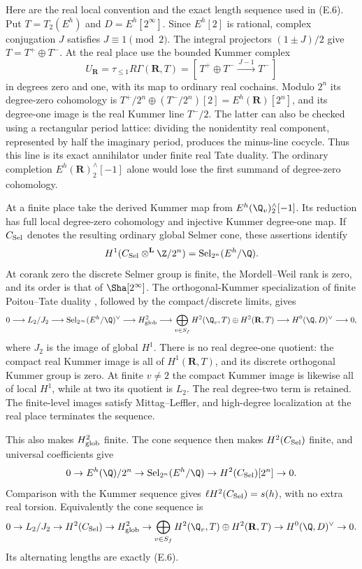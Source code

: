 Here are the real local convention and the exact length sequence used
in (E.6). Put $T=T_2(E^h)$ and $D=E^h[2^\infty]$. Since $E^h[2]$ is
rational, complex conjugation $J$ satisfies $J\equiv1\pmod2$.
The integral projectors $(1\pm J)/2$ give $T=T^+\oplus T^-$.
At the real place use the bounded Kummer complex
\[
 U_{\mathbf R}=\tau_{\le1}R\Gamma(\mathbf R,T)
   =[\,T^+\oplus T^-\xrightarrow{\,J-1\,}T^-\,]
\]
in degrees zero and one, with its map to ordinary real cochains.
Modulo $2^n$ its degree-zero cohomology is
$T^+/2^n\oplus(T^-/2^n)[2]=E^h(\mathbf R)[2^n]$, and its degree-one
image is the real Kummer line $T^-/2$. The latter can also be checked
using a rectangular period lattice: dividing the nonidentity real
component, represented by half the imaginary period, produces the
minus-line cocycle. Thus this line is its exact annihilator under
finite real Tate duality. The ordinary completion
$E^h(\mathbf R)^\wedge_2[-1]$ alone would lose the first summand of
degree-zero cohomology.

At a finite place take the derived Kummer map from
$E^h(\Q_v)^\wedge_2[-1]$. Its reduction has full local degree-zero
cohomology and injective Kummer degree-one map. If $C_{\rm Sel}$
denotes the resulting ordinary global Selmer cone, these assertions
identify
\[
 H^1(C_{\rm Sel}\otimes^{\mathbf L}\Z/2^n)
       =\operatorname{Sel}_{2^n}(E^h/\Q).
\]
At corank zero the discrete Selmer group is finite, the Mordell--Weil
rank is zero, and its order is that of $\Sha[2^\infty]$. The
orthogonal-Kummer specialization of finite Poitou--Tate duality
\cite[5.7.1.4--5.7.1.7]{nekovar}, followed by the compact/discrete
limits, gives
\[
\begin{split}
0\longrightarrow L_2/J_2
 \longrightarrow\operatorname{Sel}_{2^\infty}(E^h/\Q)^\vee
 \longrightarrow H^2_{\rm glob}
 \longrightarrow \bigoplus_{v\in S_f}H^2(\Q_v,T)\oplus H^2(\mathbf R,T)
 \longrightarrow H^0(\Q,D)^\vee\longrightarrow0 ,
\end{split}
\]
where $J_2$ is the image of global $H^1$. There is no real
degree-one quotient: the compact real Kummer image is all of
$H^1(\mathbf R,T)$, and its discrete orthogonal Kummer group is zero.
At finite $v\ne2$ the compact Kummer image is likewise all of local
$H^1$, while at two its quotient is $L_2$. The real degree-two term
is retained. The finite-level images satisfy Mittag--Leffler, and
high-degree localization at the real place terminates the sequence.

This also makes $H^2_{\rm glob}$ finite. The cone sequence then
makes $H^2(C_{\rm Sel})$ finite, and universal coefficients give
\[
 0\to E^h(\Q)/2^n
 \to\operatorname{Sel}_{2^n}(E^h/\Q)
 \to H^2(C_{\rm Sel})[2^n]\to0.
\]
Comparison with the Kummer sequence gives
$\ell H^2(C_{\rm Sel})=s(h)$, with no extra real torsion. Equivalently
the cone sequence is
\[
0\to L_2/J_2\to H^2(C_{\rm Sel})\to H^2_{\rm glob}
 \to \bigoplus_{v\in S_f}H^2(\Q_v,T)\oplus H^2(\mathbf R,T)
 \to H^0(\Q,D)^\vee\to0.
\]
Its alternating lengths are exactly (E.6).
